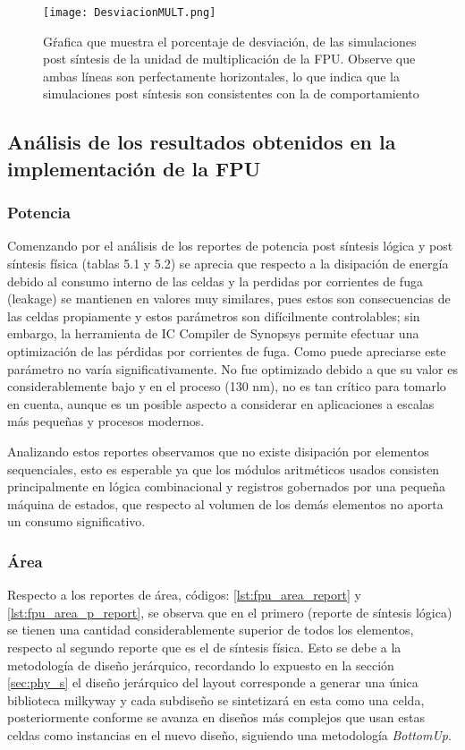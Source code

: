 \begin{figure}[h]
\texttt{[image: DesviacionMULT.png]}
\centering
\caption{Gŕafica que muestra el porcentaje de desviación, de las simulaciones post síntesis de la unidad de multiplicación de la FPU. Observe que ambas líneas son perfectamente horizontales, lo que indica que la simulaciones post síntesis son consistentes con la de comportamiento}
\label{fig:desv_mult}
\end{figure}

\newpage

\subsection{Análisis de los resultados obtenidos en la implementación de la FPU}

\subsubsection{Potencia}
Comenzando por el análisis de los reportes de potencia post síntesis lógica y post síntesis física (tablas 5.1 y 5.2) se aprecia que respecto a la disipación de energía debido al consumo interno de las celdas y la perdidas por corrientes de fuga (leakage) se mantienen en valores muy similares, pues estos son consecuencias de las celdas propiamente y estos parámetros son difícilmente controlables; sin embargo, la herramienta de IC Compiler de Synopsys permite efectuar una optimización de las pérdidas por corrientes de fuga. Como puede apreciarse este parámetro no varía significativamente. No fue optimizado debido a que su valor es considerablemente bajo y en el proceso (130 nm), no es tan crítico para tomarlo en cuenta, aunque es un posible aspecto a considerar en aplicaciones a escalas más pequeñas y procesos modernos.

Analizando estos reportes observamos que no existe disipación por elementos sequenciales, esto es esperable ya que los módulos aritméticos usados consisten principalmente en lógica combinacional y registros gobernados por una pequeña máquina de estados, que respecto al volumen de los demás elementos no aporta un consumo significativo.

\subsubsection{Área}
Respecto a los reportes de área, códigos: \ref{lst:fpu_area_report} y \ref{lst:fpu_area_p_report}, se observa que en el primero (reporte de síntesis lógica) se tienen una cantidad considerablemente superior de todos los elementos, respecto al segundo reporte que es el de síntesis física. Esto se debe a la metodología de diseño jerárquico, recordando lo expuesto en la sección \ref{sec:phy_s} el diseño jerárquico del layout corresponde a generar una única biblioteca milkyway y cada subdiseño se sintetizará en esta como una celda, posteriormente conforme se avanza en diseños más complejos que usan estas celdas como instancias en el nuevo diseño, siguiendo una metodología \textit{BottomUp}.

